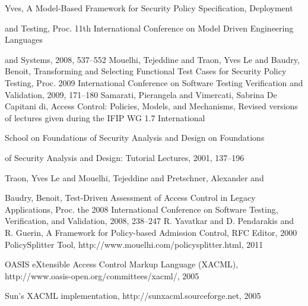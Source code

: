 \documentclass{acm_proc_article-sp}
\begin{document}
\begin{thebibliography}{1}
	Yves,
A Model-Based Framework for Security Policy Specification, Deployment

	and Testing,
Proc. 11th International Conference on Model Driven Engineering Languages

	and Systems,
2008,
537--552
Mouelhi, Tejeddine and Traon, Yves Le and Baudry, Benoit,
Transforming and Selecting Functional Test Cases for Security Policy
	Testing,
Proc. 2009 International Conference on Software Testing Verification
	and Validation,
2009,
171--180
Samarati, Pierangela and Vimercati, Sabrina De Capitani di,
Access Control: Policies, Models, and Mechanisms,
Revised versions of lectures given during the IFIP WG 1.7 International

	School on Foundations of Security Analysis and Design on Foundations

	of Security Analysis and Design: Tutorial Lectures,
2001,
137--196

Traon, Yves Le and Mouelhi, Tejeddine and Pretschner, Alexander and

	Baudry, Benoit,
Test-Driven Assessment of Access Control in Legacy Applications,
Proc. the 2008 International Conference on Software Testing, Verification,
	and Validation,
2008,
238--247
R. Yavatkar and D. Pendarakis and R. Guerin,
A Framework for Policy-based Admission Control,
RFC Editor,
2000
PolicySplitter Tool,
http://www.mouelhi.com/policysplitter.html,
2011

OASIS eXtensible Access Control Markup Language (XACML),
http://www.oasis-open.org/committees/xacml/,
2005


 Sun's XACML implementation,
http://sunxacml.sourceforge.net,
2005

\end{thebibliography}
\balancecolumns
\end{document}
